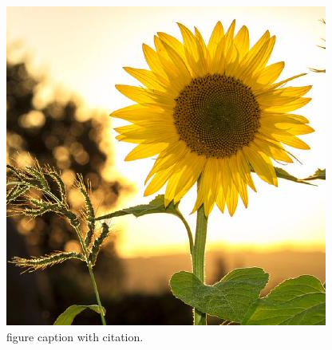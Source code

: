\documentclass[12pt,openright]{book}
\begin{document}
\begin{figure}[htp]
	\centering
	\includegraphics[width=\textwidth]{29571453}
	\caption[figure caption with citation.]{figure caption with citation.~\cite{ibge1993}} 
	\label{fig:captioncitation}
\end{figure}
\end{document}
